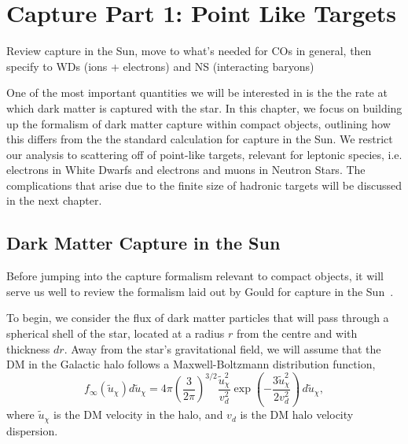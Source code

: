 \graphicspath{{img/chapter_2/}}

\chapter{Capture Part 1: Point Like Targets}
\label{chapter:capture_1}

\begin{synopsis}
Review capture in the Sun, move to what's needed for COs in general, then specify to WDs (ions + electrons) and NS (interacting baryons)
\end{synopsis}

One of the most important quantities we will be interested in is the 
the rate at which dark matter is captured with the star. 
In this chapter, we focus on building up the formalism of dark matter 
capture within compact objects, outlining how this differs from the 
the standard calculation for capture in the Sun. We restrict our analysis to 
scattering off of point-like targets, relevant for leptonic species, 
i.e. electrons in White Dwarfs and electrons and muons in Neutron Stars.
The complications that arise due to the finite size of hadronic targets 
will be discussed in the next chapter.



\section{Dark Matter Capture in the Sun}

Before jumping into the capture formalism relevant to compact objects, it will serve us well to review the formalism laid out by Gould for capture in the Sun~\cite{Gould:1987ir_ResonantEnhancementsWIMP}. 

To begin, we consider the flux of dark matter particles that will pass through a spherical shell of the star, located at a radius $r$ from the centre and with thickness $dr$. Away from the star's gravitational field, we will assume that the DM in the Galactic halo follows a Maxwell-Boltzmann distribution function, 
\begin{equation}
    f_\infty(\tilde{u}_\chi) d\tilde{u}_\chi= 4 \pi \left( \frac{3}{2 \pi} \right)^{3/2}\frac{\tilde{u}_\chi^2}{v_d^2} \exp\left(-\frac{3 \tilde u_\chi^2}{2 v_d^2}\right)\,d\tilde u_\chi, 
\end{equation}
where $\tilde u_\chi$ is the DM velocity in the halo, and $v_d$ is the DM halo velocity dispersion.  


